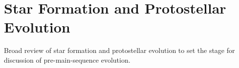 \section{Star Formation and Protostellar Evolution}
Broad review of star formation and protostellar evolution to set the stage for discussion of pre-main-sequence evolution.